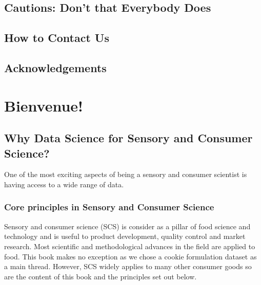 \documentclass[
]{book}
\begin{document}
\hypertarget{cautions-dont-that-everybody-does}{%
\section*{Cautions: Don't that Everybody Does}\label{cautions-dont-that-everybody-does}}

\hypertarget{how-to-contact-us}{%
\section*{How to Contact Us}\label{how-to-contact-us}}

\hypertarget{acknowledgements}{%
\section*{Acknowledgements}\label{acknowledgements}}

\hypertarget{bienvenue}{%
\chapter{Bienvenue!}\label{bienvenue}}

\hypertarget{why-data-science-for-sensory-and-consumer-science}{%
\section*{Why Data Science for Sensory and Consumer Science?}\label{why-data-science-for-sensory-and-consumer-science}}

One of the most exciting aspects of being a sensory and consumer scientist is having access to a wide range of data.

\hypertarget{core-principles-in-sensory-and-consumer-science}{%
\subsection*{Core principles in Sensory and Consumer Science}\label{core-principles-in-sensory-and-consumer-science}}

Sensory and consumer science (SCS) is consider as a pillar of food science and technology and is useful to product development, quality control and market research. Most scientific and methodological advances in the field are applied to food. This book makes no exception as we chose a cookie formulation dataset as a main thread. However, SCS widely applies to many other consumer goods so are the content of this book and the principles set out below.
\end{document}
